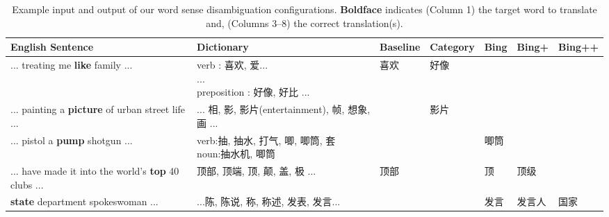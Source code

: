 \begin{CJK}{UTF8}{gbsn}
\begin{table*}[t]
  \caption{Example input and output of our word sense disambiguation configurations. {\bf Boldface} indicates (Column 1) the target word to translate and, (Columns 3--8) the correct translation(s).}
  \label{table:wsd_1}
  \begin{center}
  \begin{tabular}{| p{4cm} | p{3.5cm} | p{1.2cm} | p{1.3cm}| p{0.8cm} | p{0.9cm} | p{1cm} |}
    \hline
    English Sentence & Dictionary & Baseline & Category & Bing & Bing+ & Bing++ \\
    \hline
    ... treating me {\bf like} family ... & \parbox[t]{3cm}{verb : 喜欢, 爱...\\ ... \\preposition : 好像, 好比 ...} & 喜欢 & 好像 & & & \\
    \hline
    ... painting a {\bf picture} of urban street life ... & \parbox[t]{3cm}{... 相, 影, 影片(entertainment), 帧, 想象, 画 ...} & & 影片 & & & \\
    \hline
    ... pistol a {\bf pump} shotgun ... & \parbox[t]{3cm}{verb:抽, 抽水, 打气, 唧, 唧筒, 套\\ noun:抽水机, 唧筒} & & & 唧筒 & & \\
    \hline
    ... have made it into the world's {\bf top} 40 clubs ... & \parbox[t]{3cm}{顶部, 顶端, 顶, 颠, 盖, 极 ...} & 顶部 &  & 顶 & 顶级 & \\
    \hline
    {\bf state} department spokeswoman ... & \parbox[t]{3cm}{...陈, 陈说, 称, 称述, 发表, 发言...} & & & 发言 & 发言人 & 国家 \\
    \hline
  \end{tabular}
  \end{center}
\end{table*}




\end{CJK}
